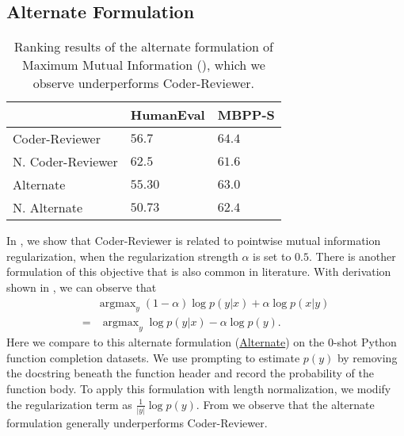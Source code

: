 \documentclass[nohyperref]{article}
\theoremstyle{plain}
\theoremstyle{definition}
\theoremstyle{remark}
\begin{document}
\subsection{Alternate Formulation}
\label{sec:app-alternate-formulation}
\begin{table}[]
\footnotesize
\centering
\begin{tabular}{lll}
\toprule
{} &               HumanEval &                  MBPP-S \\
\midrule
Coder-Reviewer       &  $56.7$ &           $\mathbf{64.4}$ \\
N. Coder-Reviewer &  $\mathbf{62.5}$ &  $61.6$ \\
\midrule
Alternate & $55.30$ & $63.0$\\
N. Alternate & $50.73$ & $62.4$\\
\bottomrule
\end{tabular} 

\caption{Ranking results of the alternate formulation of Maximum Mutual Information (), which we observe underperforms Coder-Reviewer.
}
\label{tab:alternate_table}
\vspace{-10pt}
\end{table}
In , we show that Coder-Reviewer is related to pointwise mutual information regularization, when the regularization strength $\alpha$ is set to $0.5$.
There is another formulation of this objective that is also common in literature.
With derivation shown in , we can observe that 
\begin{align*}
    &\text{argmax}_{y}\;(1-\alpha)\log p(y|x) + \alpha \log p(x|y)\\
    =&\;\text{argmax}_{y}\;\log p(y|x) - \alpha \log p(y).
\end{align*}
Here we compare to this alternate formulation (\underline{Alternate}) on the 0-shot Python function completion datasets.
We use prompting to estimate $p(y)$ by removing the docstring beneath the function header and record the probability of the function body.
To apply this formulation with length normalization, we modify the regularization term as $\frac{1}{\lvert y \rvert} \log p(y)$.
From  we observe that the alternate formulation generally underperforms Coder-Reviewer.
\end{document}
